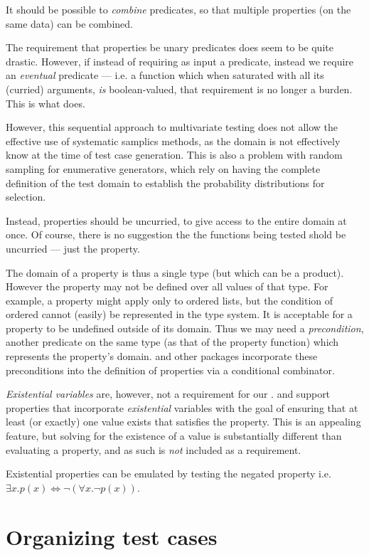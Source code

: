 It should be possible to \emph{combine} predicates, so that multiple
properties (on the same data) can be combined.

The requirement that properties be unary predicates does seem to be
quite drastic.  However, if instead of requiring as input a predicate,
instead we require an \emph{eventual} predicate --- i.e. a function
which when saturated with all its (curried) arguments, \emph{is}
boolean-valued, that requirement is no longer a burden.  This is what
\QC does.

However, this sequential approach to multivariate testing does not allow
the effective use of systematic samplics methods, as the domain is not
effectively know at the time of test case generation. This is also
a problem with random sampling for enumerative generators,
which rely on having the complete definition of the test domain to
establish the probability distributions for selection.

Instead, properties should be uncurried, to give access to the entire
domain at once. Of course, there is no suggestion the the functions being
tested shold be uncurried --- just the property.

The domain of a property is thus a single type (but which can be a 
product). However the property may not be defined over all values of that
type.  For example, a property might apply only to ordered lists,
but the condition of ordered cannot (easily) be represented in the type system.
It is acceptable for a property to be undefined outside of its domain.
Thus we may need a \emph{precondition}, another predicate on the same
type (as that of the property function) which represents the 
property's domain.  \QC and other packages incorporate these preconditions
into the definition of properties via a conditional combinator.

\emph{Existential variables} are, however, not a requirement for our \pbt.
\SC and \GAST support properties that incorporate \emph{existential} variables
with the goal of ensuring that at least (or exactly) one value exists that
satisfies the property.  This is an appealing feature,
but solving for the existence of a value is substantially different than
evaluating a property, and as such is \emph{not} included as a
requirement.

Existential properties can be emulated by testing the negated property
i.e. $\exists x . p (x) \iff \neg (\forall x . \neg p (x))$.

\section{Organizing test cases} \label{reqtestsuite}

